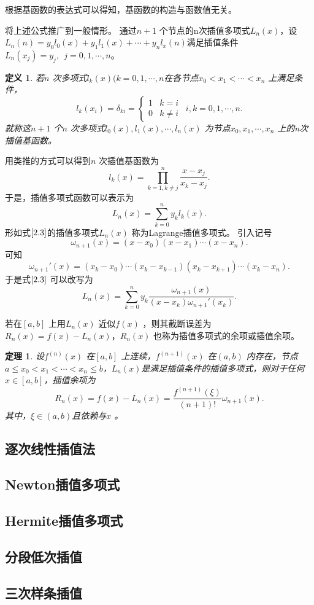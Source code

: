 \documentclass[a4paper]{article}
\begin{document}
根据基函数的表达式可以得知，基函数的构造与函数值无关。

将上述公式推广到一般情形。
通过$n+1$ 个节点的n次插值多项式$L_n(x)$，设$L_n(n) = y_0l_0(x) + y_1l_1(x) + \cdots + y_{n}l_{x}(n)$满足插值条件$L_n(x_j) = y_j, \ \ j = 0,1,\cdots,n$。
\newtheorem{definition}{定义}
\begin{definition}
若$n$ 次多项式$l_k(x)(k=0,1,\cdots,n$在各节点$x_0 < x_1 < \cdots < x_n$ 上满足条件，
\[
	l_k(x_{i}) = \delta_{ki} = \begin{cases}
		1 & k = i \\
		0 & k \neq i
	\end{cases} \ \ i,k = 0,1,\cdots,n \tag{2.2} \label{2.2}
.\] 
就称这$n+1$ 个$n$ 次多项式$l_0(x), l_1(x), \cdots, l_n(x)$ 为节点$x_0, x_1, \cdots, x_{n}$ 上的n次插值基函数。
\end{definition}
用类推的方式可以得到$n$ 次插值基函数为
\[
	l_k(x) = \prod_{k=1, k \neq j}^{n} \frac{x - x_{j}}{x_{k} - x_{j}} 
.\] 
于是，插值多项式函数可以表示为
\[
	L_n(x) = \sum_{k=0}^{n} y_k l_k(x) \tag{2.3} \label{2.3}
.\] 
形如式$\ref{2.3}$的插值多项式$L_n(x)$ 称为Lagrange插值多项式。
引入记号
\[
	\omega_{n+1}(x) = (x - x_0)(x - x_1)\cdots(x - x_{n})
.\] 
可知
\[
	\omega_{n+1}'(x) = (x_k - x_0) \cdots (x_k - x_{k-1})(x_k - x_{k+1}) \cdots (x_k - x_{n})
.\] 
于是式$\ref{2.3}$ 可以改写为
\[
	L_n(x) = \sum_{k=0}^{n} y_k \frac{\omega_{n+1}(x)}{(x-x_k)\omega_{n+1}'(x_k)}
.\]

若在$[a,b]$ 上用$L_n(x)$ 近似$f(x)$ ，则其截断误差为$R_n(x) = f(x) - L_n(x)$，$R_n(x)$ 也称为插值多项式的余项或插值余项。
\newtheorem{theorem}{定理}
\begin{theorem}
	设$f^{(n)}(x)$ 在$[a,b]$ 上连续，$f^{(n+1)}(x)$ 在$(a,b)$ 内存在，节点$a \le x_0 < x_1 < \cdots < x_n \le b $，$L_n(x)$是满足插值条件的插值多项式，则对于任何$x \in [a,b]$，插值余项为
	 \[
		 R_n(x) = f(x) - L_n(x) = \frac{f^{(n+1)}(\xi)}{(n+1)!}\omega_{n+1}(x) \tag{2.4} \label{2.4}
	.\] 
	其中，$\xi \in (a,b)$且依赖与$x$ 。
\end{theorem}

\subsection{逐次线性插值法}

\subsection{Newton插值多项式}

\subsection{Hermite插值多项式}

\subsection{分段低次插值}

\subsection{三次样条插值}
	
\end{document}
